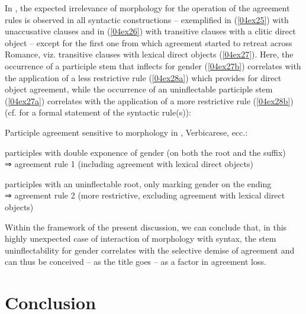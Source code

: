 \documentclass[output=paper,colorlinks,citecolor=brown]{langscibook}
\begin{document}
In , the expected irrelevance of morphology for the operation of the agreement rules is observed in all syntactic constructions -- exemplified in (\ref{04ex25}) with unaccusative clauses and in (\ref{04ex26}) with transitive clauses with a clitic direct object -- except for the first one from which agreement started to retreat across Romance, viz. transitive clauses with lexical direct objects (\ref{04ex27}). Here, the occurrence of a participle stem that inflects for gender (\ref{04ex27b}) correlates with the application of a less restrictive rule (\ref{04ex28a}) which provides for direct object agreement, while the occurrence of an uninflectable participle stem (\ref{04ex27a}) correlates with the application of a more restrictive rule (\ref{04ex28b}) (cf. \citealt[171]{loporcaro2010-change} for a formal statement of the syntactic rule(s)):

\begin{exe}
	\ex \label{04ex28} Participle agreement sensitive to morphology in , Verbicarese, ecc.:
	\begin{xlist}
		\ex \label{04ex28a} participles with double exponence of gender (on both the root and the suffix) \\
		⇒ agreement rule 1 (including agreement with lexical direct objects)
		
		\ex \label{04ex28b} participles with an uninflectable root, only marking gender on the ending \\
		⇒ agreement rule 2 (more restrictive, excluding agreement with lexical direct objects)
	\end{xlist}
\end{exe}

Within the framework of the present discussion, we can conclude that, in this highly unexpected case of interaction of morphology with syntax, the stem uninflectability for gender correlates with the selective demise of agreement and can thus be conceived -- as the title goes -- as a factor in agreement loss.

\section{Conclusion}
\end{document}
